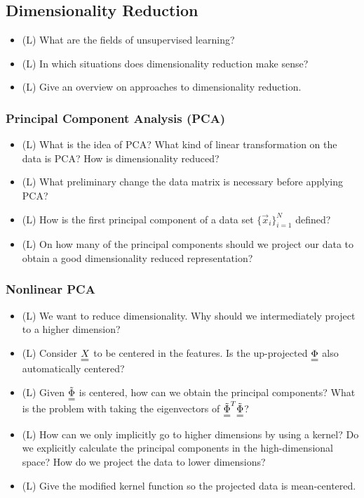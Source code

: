 \subsection*{Dimensionality Reduction}

\begin{itemize}
    \item (L) What are the fields of unsupervised learning?
    \item (L) In which situations does dimensionality reduction make sense?
    \item (L) Give an overview on approaches to dimensionality reduction.
\end{itemize}

\subsubsection*{Principal Component Analysis (PCA)}

\begin{itemize}
    \item (L) What is the idea of PCA? What kind of linear transformation on the data is PCA? How is dimensionality reduced?
    \item (L) What preliminary change the data matrix is necessary before applying PCA?
    \item (L) How is the first principal component of a data set $\{ \vec{x}_i \}_{i=1}^N$ defined?
    \item (L) On how many of the principal components should we project our data to obtain a good dimensionality 
    reduced representation?
\end{itemize}

\subsubsection*{Nonlinear PCA}
\begin{itemize}
    \item (L) We want to reduce dimensionality. Why should we intermediately project to a higher dimension?
    \item (L) Consider $\mat{X}$ to be centered in the features. Is the up-projected $\mat{\Phi}$ also automatically centered?
    \item (L) Given $\mat{\tilde{\Phi}}$ is centered, how can we obtain the principal components? What is the problem with
    taking the eigenvectors of $\mat{\tilde{\Phi}}^T \mat{\tilde{\Phi}}$?
    \item (L) How can we only implicitly go to higher dimensions by using a kernel? Do we explicitly calculate
    the principal components in the high-dimensional space? How do we project the data to lower dimensions?
    \item (L) Give the modified kernel function so the projected data is mean-centered.
\end{itemize}

